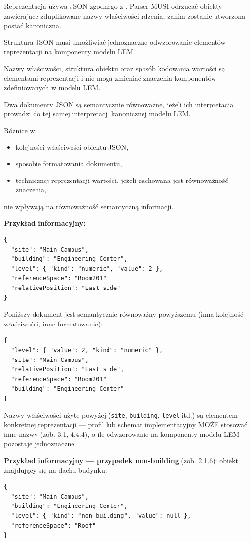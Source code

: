 Reprezentacja używa JSON zgodnego z \cite{RFC8259}. Parser MUSI odrzucać obiekty zawierające zduplikowane nazwy właściwości rdzenia, zanim zostanie utworzona postać kanoniczna.

Struktura JSON musi umożliwiać jednoznaczne odwzorowanie elementów reprezentacji na komponenty modelu LEM.

Nazwy właściwości, struktura obiektu oraz sposób kodowania wartości są elementami reprezentacji i nie mogą zmieniać znaczenia komponentów zdefiniowanych w modelu LEM.

Dwa dokumenty JSON są semantycznie równoważne, jeżeli ich interpretacja prowadzi do tej samej interpretacji kanonicznej modelu LEM.

Różnice w:
\begin{itemize}[noitemsep,topsep=2pt]
    \item kolejności właściwości obiektu JSON,
    \item sposobie formatowania dokumentu,
    \item technicznej reprezentacji wartości, jeżeli zachowana jest równoważność znaczenia,
\end{itemize}
nie wpływają na równoważność semantyczną informacji.

\noindent \textbf{Przykład informacyjny:}
\begin{verbatim}
{
  "site": "Main Campus",
  "building": "Engineering Center",
  "level": { "kind": "numeric", "value": 2 },
  "referenceSpace": "Room201",
  "relativePosition": "East side"
}
\end{verbatim}

Poniższy dokument jest semantycznie równoważny powyższemu (inna kolejność właściwości, inne formatowanie):
\begin{verbatim}
{
  "level": { "value": 2, "kind": "numeric" },
  "site": "Main Campus",
  "relativePosition": "East side",
  "referenceSpace": "Room201",
  "building": "Engineering Center"
}
\end{verbatim}

Nazwy właściwości użyte powyżej (\texttt{site}, \texttt{building}, \texttt{level} itd.) są elementem konkretnej reprezentacji --- profil lub schemat implementacyjny MOŻE stosować inne nazwy (zob. 3.1, 4.4.4), o ile odwzorowanie na komponenty modelu LEM pozostaje jednoznaczne.

\noindent \textbf{Przykład informacyjny --- przypadek non-building} (zob. 2.1.6): obiekt znajdujący się na dachu budynku:
\begin{verbatim}
{
  "site": "Main Campus",
  "building": "Engineering Center",
  "level": { "kind": "non-building", "value": null },
  "referenceSpace": "Roof"
}
\end{verbatim}

